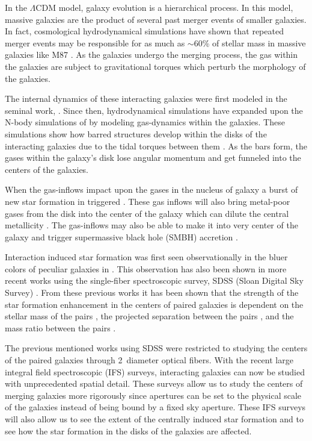 \documentclass[iop,revtex4,twocolumn,apj,numberedappendix,appendixfloats]{emulateapj}
\begin{document}
In the $\Lambda$CDM model, galaxy evolution is a hierarchical process. In this model, massive galaxies are the product of several past merger events of smaller galaxies. In fact, cosmological hydrodynamical simulations have shown that repeated merger events may be responsible for as much as $\sim$60\% of stellar mass in massive galaxies like M87 \citep[e.g.,][]{Rodriguez-Gomez:2016,Pillepich:2018}. As the galaxies undergo the merging process, the gas within the galaxies are subject to gravitational torques which perturb the morphology of the galaxies.

The internal dynamics of these interacting galaxies were first modeled in the seminal work, \citet{Toomre:1972}. Since then, hydrodynamical simulations have expanded upon the N-body simulations of \citet{Toomre:1972} by modeling gas-dynamics within the galaxies. These simulations show how barred structures develop within the disks of the interacting galaxies due to the tidal torques between them \citep{Barnes:1991}. As the bars form, the gases within the galaxy's disk lose angular momentum and get funneled into the centers of the galaxies. 

When the gas-inflows impact upon the gases in the nucleus of galaxy a burst of new star formation in triggered \citep{Barnes:1996, Mihos:1996}. These gas inflows will also bring metal-poor gases from the disk into the center of the galaxy which can dilute the central metallicity \citep{Rupke:2010, Perez:2011, Scudder:2012}. The gas-inflows may also be able to make it into very center of the galaxy and trigger supermassive black hole (SMBH) accretion \citep{Capelo:2017}. 

Interaction induced star formation was first seen observationally in the bluer colors of peculiar galaxies in \citet{Larson:1978}. This observation has also been shown in more recent works using the single-fiber spectroscopic survey, SDSS (Sloan Digital Sky Survey) \citep{Ellison:2008, Li:2008, Scudder:2012, Patton:2013, Bustamante:2020}. From these previous works it has been shown that the strength of the star formation enhancement in the centers of paired galaxies is dependent on the stellar mass of the pairs \citep{Li:2008}, the projected separation between the pairs \citep{Ellison:2008, Li:2008, Scudder:2012}, and the mass ratio between the pairs \citep{Ellison:2008}. 

The previous mentioned works using SDSS were restricted to studying the centers of the paired galaxies through 2\arcsec\ diameter optical fibers. With the recent large integral field spectroscopic (IFS) surveys, interacting galaxies can now be studied with unprecedented spatial detail. These surveys allow us to study the centers of merging galaxies more rigorously since apertures can be set to the physical scale of the galaxies instead of being bound by a fixed sky aperture. These IFS surveys will also allow us to see the extent of the centrally induced star formation and to see how the star formation in the disks of the galaxies are affected. 
\end{document}
